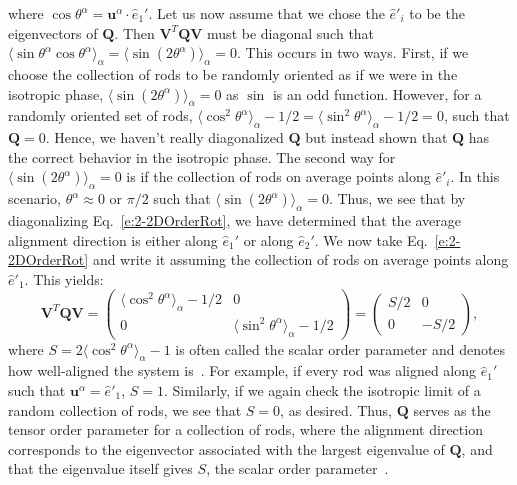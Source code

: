 where $\cos \theta^{\alpha} = \mathbf{u}^{\alpha} \cdot \hat{e}_1'$.
Let us now assume that we chose the $\hat{e}'_i$ to be the eigenvectors of $\mathbf{Q}$.
Then $ \mathbf{V}^T \mathbf{Q} \mathbf{V}$ must be diagonal such that $\langle \sin \theta^{\alpha} \cos \theta^{\alpha} \rangle_{\alpha} = \langle \sin (2 \theta^{\alpha}) \rangle_{\alpha} = 0$.
This occurs in two ways.
First, if we choose the collection of rods to be randomly oriented as if we were in the isotropic phase, $\langle \sin (2 \theta^{\alpha}) \rangle_{\alpha} = 0$ as $\sin$ is an odd function.
However, for a randomly oriented set of rods, $\langle \cos^2 \theta^{\alpha}\rangle_{\alpha} - 1/2 = \langle \sin^2 \theta^{\alpha}\rangle_{\alpha} - 1/2 = 0$, such that $\mathbf{Q} = 0$.
Hence, we haven't really diagonalized $\mathbf{Q}$ but instead shown that $\mathbf{Q}$ has the correct behavior in the isotropic phase.
The second way for $\langle \sin (2 \theta^{\alpha}) \rangle_{\alpha} = 0$ is if the collection of rods on average points along $\hat{e}'_i$.
In this scenario, $\theta^{\alpha} \approx 0 \textrm{ or } \pi/2$ such that $\langle \sin (2 \theta^{\alpha}) \rangle_{\alpha} = 0$.
Thus, we see that by diagonalizing Eq.~\ref{e:2-2DOrderRot}, we have determined that the average alignment direction is either along $\hat{e}_1'$ or along $\hat{e}_2'$.
We now take Eq.~\ref{e:2-2DOrderRot} and write it assuming the collection of rods on average points along $\hat{e}'_1$.
This yields:
\begin{equation}
  \mathbf{V}^T \mathbf{Q} \mathbf{V} =
  \begin{pmatrix}
    \langle \cos^2 \theta^{\alpha}\rangle_{\alpha} - 1/2 & 0 \\
    0 & \langle \sin^2 \theta^{\alpha} \rangle_{\alpha} - 1/2
  \end{pmatrix} =
  \begin{pmatrix}
    S/2 & 0 \\
    0 & -S/2
  \end{pmatrix},\label{e:2-2DOrderDiagBig}
\end{equation}
where $S = 2 \langle \cos^2 \theta^{\alpha} \rangle_{\alpha} - 1$ is often called the scalar order parameter and denotes how well-aligned the system is~\cite{RN33}.
For example, if every rod was aligned along $\hat{e}_1'$ such that $\mathbf{u}^{\alpha} = \hat{e}'_1$, $S = 1$.
Similarly, if we again check the isotropic limit of a random collection of rods, we see that $S = 0$, as desired.
Thus, $\mathbf{Q}$ serves as the tensor order parameter for a collection of rods, where the alignment direction corresponds to the eigenvector associated with the largest eigenvalue of $\mathbf{Q}$, and that the eigenvalue itself gives $S$, the scalar order parameter~\cite{RN33}.
